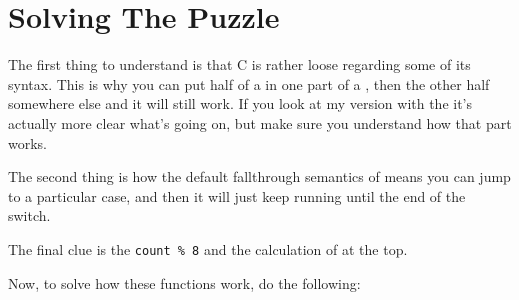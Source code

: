 \section{Solving The Puzzle}

The first thing to understand is that C is rather loose regarding some
of its syntax.  This is why you can put half of a  in
one part of a , then the other half somewhere
else and it will still work.  If you look at my version with the 
it's actually more clear what's going on, but make sure you understand
how that part works.

The second thing is how the default fallthrough semantics of
 means you can jump to a particular case, and
then it will just keep running until the end of the switch.

The final clue is the \verb|count % 8| and the calculation of  at
the top.

Now, to solve how these functions work, do the following:


